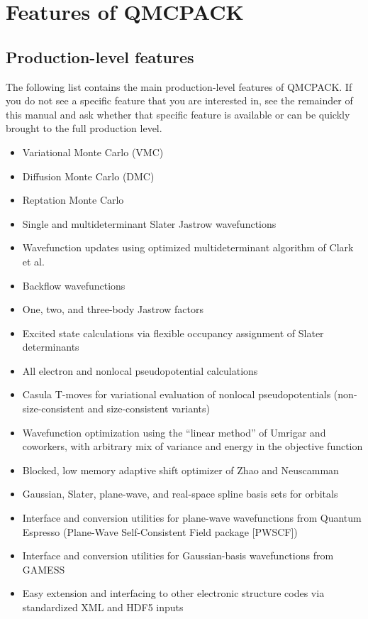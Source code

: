 \chapter{Features of QMCPACK}
\label{chap:features}
\section{Production-level features}
The following list contains the main production-level features of QMCPACK. If
you do not see a specific feature that you are interested in,
see the remainder of this manual and ask whether that specific feature is
available or can be quickly  brought to the full production level.

\begin{itemize}
\item Variational Monte Carlo (VMC)
\item Diffusion Monte Carlo (DMC)
\item Reptation Monte Carlo
\item Single and multideterminant Slater Jastrow wavefunctions
\item Wavefunction updates using optimized multideterminant algorithm of Clark et al.
\item Backflow wavefunctions
\item One, two, and three-body Jastrow factors
\item Excited state calculations via flexible occupancy assignment of Slater determinants
\item All electron and nonlocal pseudopotential calculations
\item Casula T-moves for variational evaluation of nonlocal
  pseudopotentials (non-size-consistent and size-consistent variants)
\item Wavefunction optimization using the ``linear method'' of Umrigar
  and coworkers, with arbitrary mix of variance and energy in the
  objective function
\item Blocked, low memory adaptive shift optimizer of Zhao and Neuscamman 
\item Gaussian, Slater, plane-wave, and real-space spline basis sets for orbitals
\item Interface and conversion utilities for plane-wave wavefunctions from Quantum Espresso (Plane-Wave Self-Consistent Field package [PWSCF])
\item Interface and conversion utilities for Gaussian-basis wavefunctions from GAMESS
\item Easy extension and interfacing to other electronic structure codes via standardized XML and HDF5 inputs

\end{itemize}
